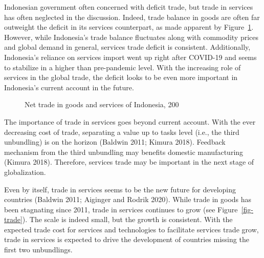 \documentclass[
  letterpaper,
  DIV=11,
  numbers=noendperiod]{scrartcl}
\begin{document}
Indonesian government often concerned with deficit trade, but trade in
services has often neglected in the discussion. Indeed, trade balance in
goods are often far outweight the deficit in its services counterpart,
as made apparent by Figure~\ref{fig-2}. However, while Indonesia's trade
balance fluctuates along with commodity prices and global demand in
general, services trade deficit is consistent. Additionally, Indonesia's
reliance on services import went up right after COVID-19 and seems to
stabilize in a higher than pre-pandemic level. With the increasing role
of services in the global trade, the deficit looks to be even more
important in Indonesia's current account in the future.

\begin{figure}


\caption{\label{fig-2}Net trade in goods and services of Indonesia, 200}

\end{figure}%

The importance of trade in services goes beyond current account. With
the ever decreasing cost of trade, separating a value up to tasks level
(i.e., the third unbundling) is on the horizon (Baldwin 2011; Kimura
2018). Feedback mechanism from the third unbundling may benefits
domestic manufacturing (Kimura 2018). Therefore, services trade may be
important in the next stage of globalization.

Even by itself, trade in services seems to be the new future for
developing countries (Baldwin 2011; Aiginger and Rodrik 2020). While
trade in goods has been stagnating since 2011, trade in services
continues to grow (see Figure~\ref{fig-trade}). The scale is indeed
small, but the growth is consistent. With the expected trade cost for
services and technologies to facilitate services trade grow, trade in
services is expected to drive the development of countries missing the
first two unbundlings.
\end{document}
